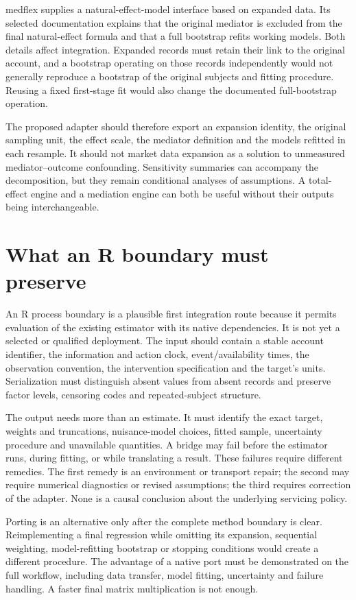 medflex supplies a natural-effect-model interface based on expanded data. Its
selected documentation explains that the original mediator is excluded from
the final natural-effect formula and that a full bootstrap refits working
models. Both details affect integration. Expanded records must retain their
link to the original account, and a bootstrap operating on those records
independently would not generally reproduce a bootstrap of the original
subjects and fitting procedure. Reusing a fixed first-stage fit would also
change the documented full-bootstrap operation.\cite{medflex}

The proposed adapter should therefore export an expansion identity, the
original sampling unit, the effect scale, the mediator definition and the
models refitted in each resample. It should not market data expansion as a
solution to unmeasured mediator--outcome confounding. Sensitivity summaries
can accompany the decomposition, but they remain conditional analyses of
assumptions. A total-effect engine and a mediation engine can both be useful
without their outputs being interchangeable.

\section{What an R boundary must preserve}

An R process boundary is a plausible first integration route because it permits
evaluation of the existing estimator with its native dependencies. It is not
yet a selected or qualified deployment. The input should contain a stable
account identifier, the information and action clock, event/availability
times, the observation convention, the intervention specification and the
target's units. Serialization must distinguish absent values from absent
records and preserve factor levels, censoring codes and repeated-subject
structure.

The output needs more than an estimate. It must identify the exact target,
weights and truncations, nuisance-model choices, fitted sample, uncertainty
procedure and unavailable quantities. A bridge may fail before the estimator
runs, during fitting, or while translating a result. These failures require
different remedies. The first remedy is an environment or transport repair;
the second may require numerical diagnostics or revised assumptions; the
third requires correction of the adapter. None is a causal conclusion about
the underlying servicing policy.

Porting is an alternative only after the complete method boundary is clear.
Reimplementing a final regression while omitting its expansion, sequential
weighting, model-refitting bootstrap or stopping conditions would create a
different procedure. The advantage of a native port must be demonstrated on
the full workflow, including data transfer, model fitting, uncertainty and
failure handling. A faster final matrix multiplication is not enough.

